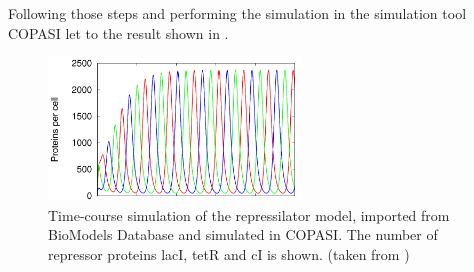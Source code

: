 Following those steps and performing the simulation in the simulation tool COPASI \citep{Hoops:2006} let to the result shown in . 

\begin{figure}
\centering
\includegraphics[width=0.6\textwidth]{images/simEx1.png}
\caption{Time-course simulation of the repressilator model, imported from BioModels Database and simulated in COPASI. The number of repressor proteins lacI, tetR and cI is shown. (taken from \citep{Waltemath:2010})}
\label{fig:simEx1}
\end{figure}

